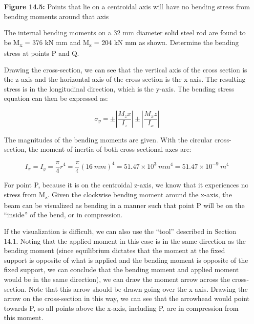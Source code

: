 \documentclass[
  letterpaper,
  DIV=11,
  numbers=noendperiod]{scrreprt}
\theoremstyle{definition}
\theoremstyle{remark}
\begin{document}
\textbf{Figure 14.5:} Points that lie on a centroidal axis will have no
bending stress from bending moments around that axis

\begin{tcolorbox}[enhanced jigsaw, leftrule=.75mm, colbacktitle=quarto-callout-tip-color!10!white, breakable, opacityback=0, colback=white, titlerule=0mm, toprule=.15mm, colframe=quarto-callout-tip-color-frame, coltitle=black, title={Example 14.1}, toptitle=1mm, bottomrule=.15mm, rightrule=.15mm, left=2mm, arc=.35mm, opacitybacktitle=0.6, bottomtitle=1mm]

The internal bending moments on a 32 mm diameter solid steel rod are
found to be M\textsubscript{x} = 376 kN mm and M\textsubscript{z} = 204
kN mm as shown. Determine the bending stress at points P and Q.

\begin{tcolorbox}[enhanced jigsaw, leftrule=.75mm, colbacktitle=quarto-callout-note-color!10!white, breakable, opacityback=0, colback=white, titlerule=0mm, toprule=.15mm, colframe=quarto-callout-note-color-frame, coltitle=black, title={Solution}, toptitle=1mm, bottomrule=.15mm, rightrule=.15mm, left=2mm, arc=.35mm, opacitybacktitle=0.6, bottomtitle=1mm]

Drawing the cross-section, we can see that the vertical axis of the
cross section is the z-axis and the horizontal axis of the cross section
is the x-axis. The resulting stress is in the longitudinal direction,
which is the y-axis. The bending stress equation can then be expressed
as:

\[
\sigma_y= \pm\left|\frac{M_z x}{I_z}\right| \pm\left|\frac{M_x z}{I_x}\right|
\]

The magnitudes of the bending moments are given. With the circular
cross-section, the moment of inertia of both cross-sectional axes are:

\[
I_x=I_y=\frac{\pi}{4} r^4=\frac{\pi}{4}(16{~mm})^4=51.47 \times 10^3{~mm}^4=51.47 \times 10^{-9}{~m}^4
\]

For point P, because it is on the centroidal z-axis, we know that it
experiences no stress from M\textsubscript{z}. Given the clockwise
bending moment around the x-axis, the beam can be visualized as bending
in a manner such that point P will be on the ``inside'' of the bend, or
in compression.

If the visualization is difficult, we can also use the ``tool''
described in Section 14.1. Noting that the applied moment in this case
is in the same direction as the bending moment (since equilibrium
dictates that the moment at the fixed support is opposite of what is
applied and the bending moment is opposite of the fixed support, we can
conclude that the bending moment and applied moment would be in the same
direction), we can draw the moment arrow across the cross-section. Note
that this arrow should be drawn going over the x-axis. Drawing the arrow
on the cross-section in this way, we can see that the arrowhead would
point towards P, so all points above the x-axis, including P, are in
compression from this moment.


\end{tcolorbox}
\end{tcolorbox}
\end{document}
